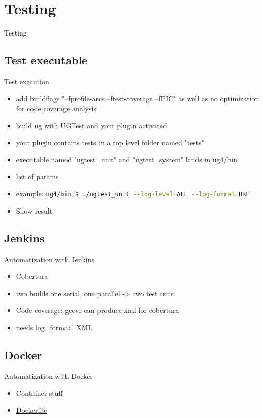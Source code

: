 \documentclass{beamer}
\newcommand{\sectiontitle}[1]{
    \section{#1}
    \begin{frame}
        \centering
        \LARGE{#1}
    \end{frame}
}
\begin{document}
    \sectiontitle{Testing}
        \subsection{Test executable}
        \begin{frame}{Test execution}
            \begin{itemize}
                \item add buildflags "--fprofile-arcs --ftest-coverage --fPIC" as well as no optimization for code coverage analysis
                \item build ug with UGTest and your plugin activated
                \item your plugin contains tests in a top level folder named "tests"
                \item executable named "ugtest\_unit" and "ugtest\_system" lands in ug4/bin
                \item \href{https://www.boost.org/doc/libs/1_58_0/libs/test/doc/html/utf/user-guide/runtime-config/reference.html}{list of params}
                \item example: \lstinline[language=bash]{ug4/bin $ ./ugtest_unit --log-level=ALL --log-format=HRF}
                \item Show result
            \end{itemize}
        \end{frame}
        
        \subsection{Jenkins}
        \begin{frame}{Automatization with Jenkins}
            \begin{itemize}
                \item Cobertura
                \item two builds one serial, one parallel -> two test runs
                \item Code coverage: gcovr can produce xml for cobertura
                \item needs log\_format=XML
            \end{itemize}
        \end{frame}

        \subsection{Docker}
        \begin{frame}{Automatization with Docker}
            \begin{itemize}
                \item Container stuff
                \item \href{https://github.com/Tobias-Trautmann/docker4ug4}{Dockerfile}
            \end{itemize}
        \end{frame}
\end{document}
